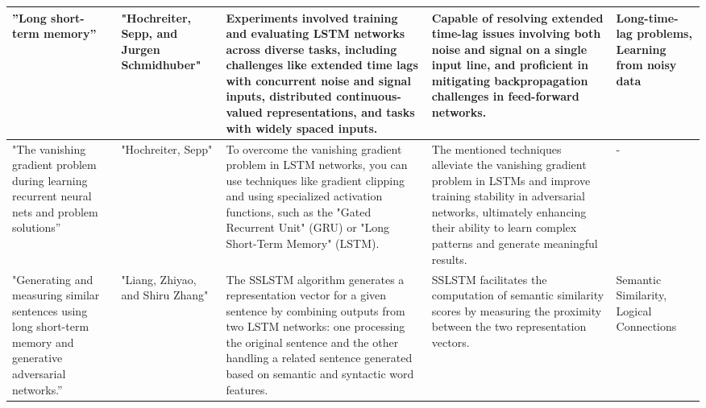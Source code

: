 \documentclass[fleqn,10pt]{thescipub} %
\begin{document}
\begin{table}
\begin{center}
\begin{tabular}{ |p{2cm}|p{2cm}|p{3.75cm}|p{3.75cm}|p{3.5cm}| }
\hline
”Long short-term memory” &  "Hochreiter, Sepp, and Jurgen Schmidhuber" & Experiments involved training and evaluating LSTM networks across diverse tasks, including challenges like extended time lags with concurrent noise and signal inputs, distributed continuous-valued representations, and tasks with widely spaced inputs. & Capable of resolving extended time-lag issues involving both noise and signal on a single input line, and proficient in mitigating backpropagation challenges in feed-forward networks. &  Long-time-lag problems, Learning from noisy data  \\
\hline
"The vanishing gradient problem during learning recurrent neural nets and problem solutions” &  "Hochreiter, Sepp" &  To overcome the vanishing gradient problem in LSTM networks, you can use techniques like gradient clipping and using specialized activation functions, such as the "Gated Recurrent Unit" (GRU) or "Long Short-Term Memory" (LSTM). &  The mentioned techniques alleviate the vanishing gradient problem in LSTMs and improve training stability in adversarial networks, ultimately enhancing their ability to learn complex patterns and generate meaningful results. & -  \\
\hline
"Generating and measuring similar sentences using long short-term memory and generative adversarial networks.”  &  "Liang, Zhiyao, and Shiru Zhang" &  The SSLSTM algorithm generates a representation vector for a given sentence by combining outputs from two LSTM networks: one processing the original sentence and the other handling a related sentence generated based on semantic and syntactic word features. &  SSLSTM facilitates the computation of semantic similarity scores by measuring the proximity between the two representation vectors. &  Semantic Similarity, Logical Connections  \\
\hline
\end{tabular}
\end{center}
\end{table}
\end{document}
